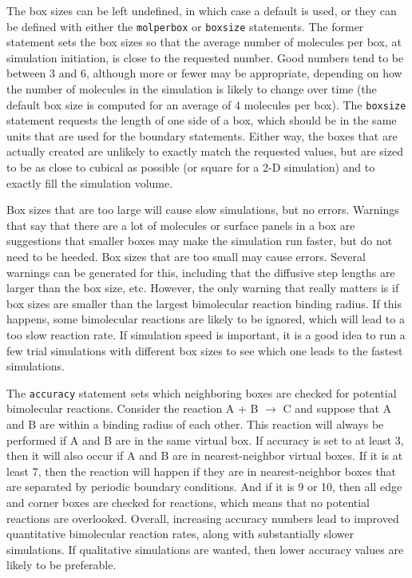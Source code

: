 \documentclass {scrbook}
\newcommand {\ttt} {\texttt}
\begin{document}
The box sizes can be left undefined, in which case a default is used, or they can be defined with either the \ttt{molperbox} or \ttt{boxsize} statements. The former statement sets the box sizes so that the average number of molecules per box, at simulation initiation, is close to the requested number. Good numbers tend to be between 3 and 6, although more or fewer may be appropriate, depending on how the number of molecules in the simulation is likely to change over time (the default box size is computed for an average of 4 molecules per box). The \ttt{boxsize} statement requests the length of one side of a box, which should be in the same units that are used for the boundary statements. Either way, the boxes that are actually created are unlikely to exactly match the requested values, but are sized to be as close to cubical as possible (or square for a 2-D simulation) and to exactly fill the simulation volume.

Box sizes that are too large will cause slow simulations, but no errors. Warnings that say that there are a lot of molecules or surface panels in a box are suggestions that smaller boxes may make the simulation run faster, but do not need to be heeded. Box sizes that are too small may cause errors. Several warnings can be generated for this, including that the diffusive step lengths are larger than the box size, etc. However, the only warning that really matters is if box sizes are smaller than the largest bimolecular reaction binding radius. If this happens, some bimolecular reactions are likely to be ignored, which will lead to a too slow reaction rate. If simulation speed is important, it is a good idea to run a few trial simulations with different box sizes to see which one leads to the fastest simulations.

The \ttt{accuracy} statement sets which neighboring boxes are checked for potential bimolecular reactions. Consider the reaction A + B $\rightarrow$ C and suppose that A and B are within a binding radius of each other. This reaction will always be performed if A and B are in the same virtual box. If accuracy is set to at least 3, then it will also occur if A and B are in nearest-neighbor virtual boxes. If it is at least 7, then the reaction will happen if they are in nearest-neighbor boxes that are separated by periodic boundary conditions. And if it is 9 or 10, then all edge and corner boxes are checked for reactions, which means that no potential reactions are overlooked. Overall, increasing accuracy numbers lead to improved quantitative bimolecular reaction rates, along with substantially slower simulations. If qualitative simulations are wanted, then lower accuracy values are likely to be preferable.
\end{document}
